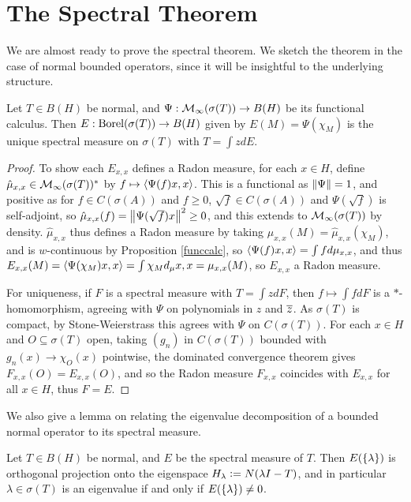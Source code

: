 \documentclass[10pt]{amsart}
\begin{document}
\section{The Spectral Theorem}
We are almost ready to prove the spectral theorem. We sketch the theorem in the case of normal bounded operators, since it will be insightful to the underlying structure.
\begin{theorem}\label{specnorm}
    Let $T \in B(H)$ be normal, and $\Psi : \mathcal{M}_\infty(\sigma(T)) \to B(H)$ be its functional calculus. Then $E : \operatorname{Borel}(\sigma(T)) \to B(H)$ given by $E(M) = \Psi(\chi_M)$ is the unique spectral measure on $\sigma(T)$ with $T = \int z dE$.
\end{theorem}
\begin{proof}
    To show each $E_{x, x}$ defines a Radon measure, for each $x \in H$, define $\hat\mu_{x, x} \in \mathcal{M}_\infty(\sigma(T))^*$ by $f \mapsto \left\langle \Psi(f)x, x \right\rangle$. This is a functional as $\left\| \Psi \right\| = 1$, and positive as for $f \in C(\sigma(A))$ and $f \geq 0$, $\sqrt{f} \in C(\sigma(A))$ and $\Psi(\sqrt{f})$ is self-adjoint, so $\hat\mu_{x, x}(f) = \left\| \Psi(\sqrt{f})x \right\|^2 \geq 0$, and this extends to $\mathcal{M}_\infty(\sigma(T))$ by density. $\hat\mu_{x, x}$ thus defines a Radon measure by taking $\mu_{x, x}(M) = \hat\mu_{x, x}(\chi_M)$, and is $w$-continuous by Proposition \ref{funccalc}, so $\left\langle \Psi(f)x, x \right\rangle = \int f d\mu_{x, x}$, and thus $E_{x, x}(M) = \left\langle \Psi(\chi_M)x, x \right\rangle = \int \chi_M d_\mu{x, x} = \mu_{x, x}(M)$, so $E_{x, x}$ a Radon measure.

    For uniqueness, if $F$ is a spectral measure with $T = \int z dF$, then $f \mapsto \int f dF$ is a $*$-homomorphism, agreeing with $\Psi$ on polynomials in $z$ and $\overline{z}$. As $\sigma(T)$ is compact, by Stone-Weierstrass this agrees with $\Psi$ on $C(\sigma(T))$. For each $x \in H$ and $O \subseteq \sigma(T)$ open, taking $(g_n)$ in $C(\sigma(T))$ bounded with $g_n(x) \to \chi_O(x)$ pointwise, the dominated convergence theorem gives $F_{x, x}(O) = E_{x, x}(O)$, and so the Radon measure $F_{x, x}$ coincides with $E_{x, x}$ for all $x \in H$, thus $F = E$.
\end{proof}
We also give a lemma on relating the eigenvalue decomposition of a bounded normal operator to its spectral measure.
\begin{lemma}\label{bdnormaleigen}
    Let $T \in B(H)$ be normal, and $E$ be the spectral measure of $T$. Then $E(\left\{  \lambda  \right\})$ is orthogonal projection onto the eigenspace $H_\lambda \vcentcolon= N(\lambda I - T)$, and in particular $\lambda \in \sigma(T)$ is an eigenvalue if and only if $E(\left\{  \lambda  \right\}) \neq 0$.
\end{lemma}
\end{document}
